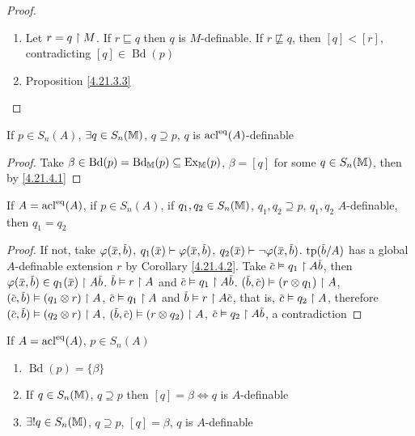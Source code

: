 \documentclass[11pt]{article}
\DeclareMathOperator{\Ex}{Ex}
\DeclareMathOperator{\Bd}{Bd}
\begin{document}
\begin{proof}
\begin{enumerate}
\item Let \(r=q\upharpoonright M\). If \(r\sqsubseteq q\) then \(q\) is \(M\)-definable. If \(r\not\sqsubseteq q\),
then \([q]<[r]\), contradicting \([q]\in\Bd(p)\)
\item Proposition \ref{4.21.3.3}
\end{enumerate}
\end{proof}

\begin{corollary}[]
\label{4.21.4.2}
If \(p\in S_n(A)\), \(\exists q\in S_n(\mathbb{M})\), \(q\supseteq p\), \(q\) is \(\operatorname{acl}^{\operatorname{eq}}(A)\)-definable
\end{corollary}

\begin{proof}
Take \(\beta\in\Bd(p)=\Bd_{\M}(p)\subseteq\Ex_{\M}(p)\), \(\beta=[q]\) for some \(q\in S_n(\mathbb{M})\), then by \ref{4.21.4.1}
\end{proof}

\begin{proposition}[]
\label{4.21.4.3}
If \(A=\operatorname{acl}^{\operatorname{eq}}(A)\), if \(p\in S_n(A)\),
if \(q_1,q_2\in S_n(\mathbb{M})\), \(q_1,q_2\supseteq p\), \(q_1,q_2\) \(A\)-definable, then \(q_1=q_2\)
\end{proposition}

\begin{proof}
If not, take \(\varphi(\barx,\barb)\),
\(q_1(\barx)\vdash\varphi(\barx,\barb)\), \(q_2(\barx)\vdash\neg\varphi(\barx,\barb)\). \(\tp(\barb/A)\) has a
global \(A\)-definable extension \(r\) by Corollary \ref{4.21.4.2}. Take \(\barc\vDash q_1\uhr A\barb\),
then \(\varphi(\barx,\barb)\in q_1(\barx)\uhr A\barb\). \(\barb\vDash r\uhr A\)
and \(\barc\vDash q_1\uhr A\barb\).
\((\barb,\barc)\vDash(r\otimes q_1)\uhr A\), \((\barc,\barb)\vDash(q_1\otimes r)\uhr A\), \(\barc\vDash q_1\uhr A\)
and \(\barb\vDash r\uhr A\barc\), that is, \(\barc\vDash q_2\uhr A\),
therefore
\((\barc,\barb)\vDash(q_2\otimes r)\uhr A\), \((\barb,\barc)\vDash(r\otimes q_2)\uhr A\), \(\barc\vDash q_2\uhr A\barb\), a contradiction
\end{proof}

\begin{proposition}[]
\label{4.21.4.4}
If \(A=\operatorname{acl}^{\operatorname{eq}}(A)\), \(p\in S_n(A)\)
\begin{enumerate}
\item \(\Bd(p)=\{\beta\}\)
\item If \(q\in S_n(\mathbb{M})\), \(q\supseteq p\) then \([q]=\beta\Leftrightarrow q\) is \(A\)-definable
\item \(\exists!q\in S_n(\mathbb{M})\), \(q\supseteq p\), \([q]=\beta\), \(q\) is \(A\)-definable
\end{enumerate}
\end{proposition}
\end{document}

